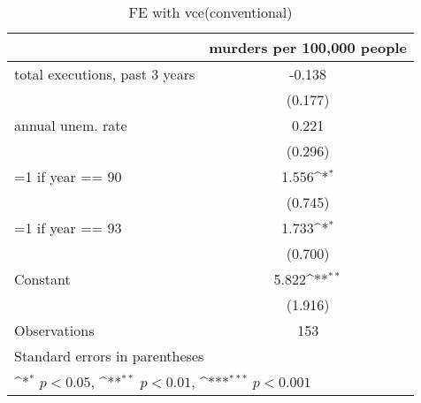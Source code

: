 \begin{table}[htbp]\centering
\def\sym#1{\ifmmode^{#1}\else\(^{#1}\)\fi}
\caption{FE with vce(conventional)}
\begin{tabular}{l*{1}{c}}
\hline\hline
                    &\multicolumn{1}{c}{murders per 100,000 people}\\
\hline
total executions, past 3 years&      -0.138         \\
                    &     (0.177)         \\
[1em]
annual unem. rate   &       0.221         \\
                    &     (0.296)         \\
[1em]
=1 if year == 90    &       1.556\sym{*}  \\
                    &     (0.745)         \\
[1em]
=1 if year == 93    &       1.733\sym{*}  \\
                    &     (0.700)         \\
[1em]
Constant            &       5.822\sym{**} \\
                    &     (1.916)         \\
\hline
Observations        &         153         \\
\hline\hline
\multicolumn{2}{l}{\footnotesize Standard errors in parentheses}\\
\multicolumn{2}{l}{\footnotesize \sym{*} \(p<0.05\), \sym{**} \(p<0.01\), \sym{***} \(p<0.001\)}\\
\end{tabular}
\end{table}
